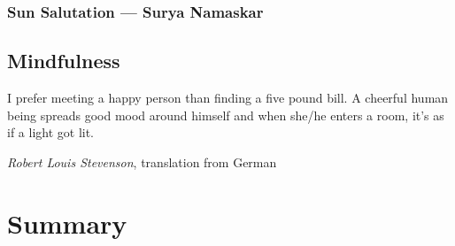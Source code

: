 \documentclass[../main.tex]{subfiles}
\begin{document}
\subsection{Sun Salutation ---  Surya Namaskar}

\section{Mindfulness}
\newpage
{}
\epigraph{I prefer meeting a happy person than finding a five pound bill. A cheerful human being spreads good mood around himself and when she/he enters a room, it's as if a light got lit.}{\textit{Robert Louis Stevenson}, translation from German}

\chapter{Summary}
\end{document}
